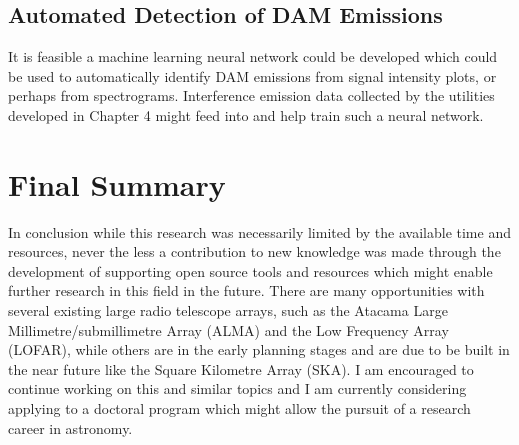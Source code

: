 \subsection*{Automated Detection of DAM Emissions}

It is feasible a machine learning neural network could be developed which could be used to automatically identify \gls{DAM} emissions from signal intensity plots, or perhaps from spectrograms. Interference emission data collected by the utilities developed in Chapter 4 might feed into and help train such a neural network.

\section*{Final Summary}

In conclusion while this research was necessarily limited by the available time and resources, never the less a contribution to new knowledge was made through the development of supporting open source tools and resources which might enable further research in this field in the future. There are many opportunities with several existing large radio telescope arrays, such as the Atacama Large Millimetre/submillimetre Array (ALMA) and the Low Frequency Array (LOFAR), while others are in the early planning stages and are due to be built in the near future like the Square Kilometre Array (SKA). I am encouraged to continue working on this and similar topics and I am currently considering applying to a doctoral program which might allow the pursuit of a research career in astronomy.